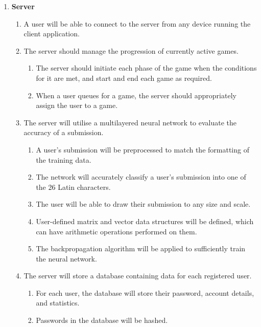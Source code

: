 \documentclass{article}
\begin{document}
\begin{enumerate}
    \item \textbf{Server}
    \begin{enumerate}
        \item A user will be able to connect to the server from any device running the client application.
        \item The server should manage the progression of currently active games.
        \begin{enumerate}
            \item The server should initiate each phase of the game when the conditions for it are met, and start and end each game as required.
            \item When a user queues for a game, the server should appropriately assign the user to a game.
        \end{enumerate}
        \item The server will utilise a multilayered neural network to evaluate the accuracy of a submission.
        \begin{enumerate}
            \item A user's submission will be preprocessed to match the formatting of the training data.
            \item The network will accurately classify a user's submission into one of the 26 Latin characters.
            \item The user will be able to draw their submission to any size and scale.
			\item User-defined matrix and vector data structures will be defined, which can have arithmetic operations performed on them.
			\item The backpropagation algorithm will be applied to sufficiently train the neural network.
        \end{enumerate}
        \item The server will store a database containing data for each registered user.
        \begin{enumerate}
            \item For each user, the database will store their password, account details, and statistics.
            \item Passwords in the database will be hashed.
        \end{enumerate}
    \end{enumerate}
    

\end{enumerate}
\end{document}
